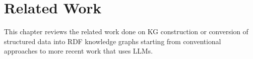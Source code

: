 \section{Related Work}\label{sec:related_work}

This chapter reviews the related work done on KG construction or conversion of structured data into RDF knowledge graphs starting from conventional approaches to more recent work that uses LLMs.





